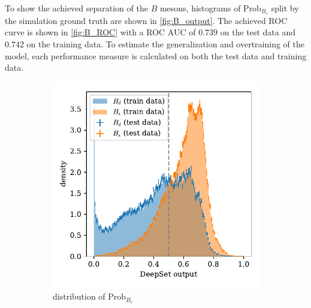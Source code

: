 To show the achieved separation of the $B$ mesons, histograms of $\text{Prob}_{B_s}$ split by the simulation ground truth are shown in \autoref{fig:B_output}.
The achieved ROC curve is shown in \autoref{fig:B_ROC} with a ROC AUC of $0.739$ on the test data and $0.742$ on the training data.
To estimate the generalization and overtraining of the model, each performance measure is calculated on both the test data and training data.

\begin{figure}
    \centering
    \begin{subfigure}{0.5\textwidth}
        \centering
        \includegraphics[width=\textwidth]{images/B_output.pdf}
        \caption{distribution of $\text{Prob}_{B_s}$}
        \label{fig:B_output}
    \end{subfigure}%
    \begin{subfigure}{0.5\textwidth}
        \centering

\end{subfigure}
\end{figure}
